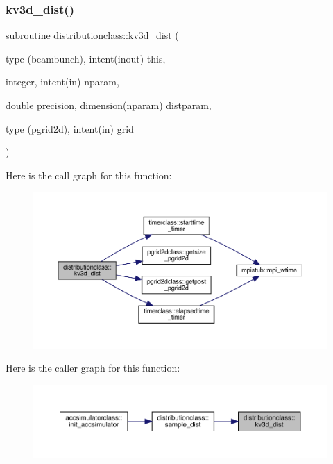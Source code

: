 \subsubsection{\texorpdfstring{kv3d\_dist()}{kv3d\_dist()}}
{\footnotesize\ttfamily subroutine distributionclass\+::kv3d\+\_\+dist (\begin{DoxyParamCaption}\item[{type (beambunch), intent(inout)}]{this,  }\item[{integer, intent(in)}]{nparam,  }\item[{double precision, dimension(nparam)}]{distparam,  }\item[{type (pgrid2d), intent(in)}]{grid }\end{DoxyParamCaption})}

Here is the call graph for this function\+:\nopagebreak
\begin{figure}[H]
\begin{center}
\leavevmode
\includegraphics[width=350pt]{namespacedistributionclass_a2e96d2c85cac39531d37f2ce057c5766_cgraph}
\end{center}
\end{figure}
Here is the caller graph for this function\+:\nopagebreak
\begin{figure}[H]
\begin{center}
\leavevmode
\includegraphics[width=350pt]{namespacedistributionclass_a2e96d2c85cac39531d37f2ce057c5766_icgraph}
\end{center}
\end{figure}
\mbox{\label{namespacedistributionclass_a00377c8aa90fa9dc8b222d71d019f936}} 
